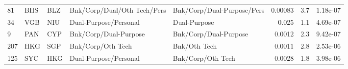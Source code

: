 {\begin{longtable}{@{}lllp{3cm}p{3cm}rrr@{}}
81  & BHS & BLZ & Bnk/Corp/Dual/Oth Tech/Pers & Bnk/Corp/Dual-Purpose/Pers  & 0.00083  & 3.7       & 1.18e-07  \\
34  & VGB & NIU & Dual-Purpose/Personal       & Dual-Purpose                & 0.025    & 1.1       & 4.69e-07  \\
9   & PAN & CYP & Bnk/Corp/Dual-Purpose       & Bnk/Corp/Dual-Purpose       & 0.0012   & 2.3       & 9.42e-07  \\
207 & HKG & SGP & Bnk/Corp/Oth Tech           & Bnk/Oth Tech                & 0.0011   & 2.8       & 2.53e-06  \\
125 & SYC & HKG & Dual-Purpose/Personal       & Bnk/Corp/Oth Tech           & 0.0028   & 1.8       & 3.98e-06  \\
\end{longtable}
} %
\clearpage






